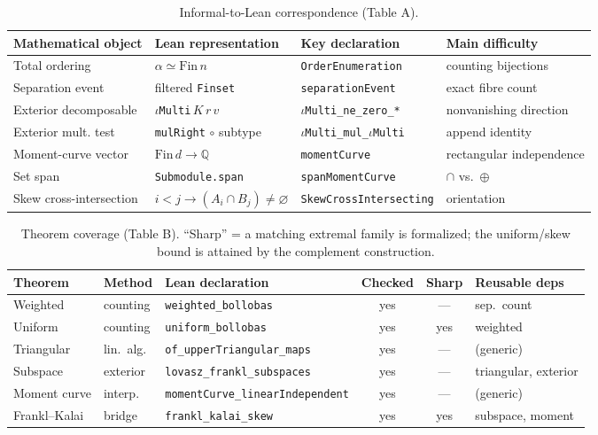\documentclass[11pt]{article}
\newcommand{\QQ}{\mathbb{Q}}
\begin{document}
\begin{table}[t]
\centering\small
\begin{tabular}{@{}llll@{}}
\toprule
Mathematical object & Lean representation & Key declaration & Main difficulty \\
\midrule
Total ordering & $\alpha\simeq\mathrm{Fin}\,n$ & \texttt{OrderEnumeration} & counting bijections \\
Separation event & filtered \texttt{Finset} & \texttt{separationEvent} & exact fibre count \\
Exterior decomposable & $\iota$\texttt{Multi}$\,K\,r\,v$ & \texttt{\(\iota\)Multi\_ne\_zero\_*} & nonvanishing direction \\
Exterior mult. test & \texttt{mulRight} $\circ$ subtype & \texttt{\(\iota\)Multi\_mul\_\(\iota\)Multi} & append identity \\
Moment-curve vector & $\mathrm{Fin}\,d\to\QQ$ & \texttt{momentCurve} & rectangular independence \\
Set span & \texttt{Submodule.span} & \texttt{spanMomentCurve} & $\cap$ vs.\ $\oplus$ \\
Skew cross-intersection & $i<j\to(A_i\cap B_j)\neq\varnothing$ & \texttt{SkewCrossIntersecting} & orientation \\
\bottomrule
\end{tabular}
\caption{Informal-to-Lean correspondence (Table A).}
\label{tab:correspondence}
\end{table}

\begin{table}[t]
\centering\small
\begin{tabular}{@{}lllccl@{}}
\toprule
Theorem & Method & Lean declaration & Checked & Sharp & Reusable deps \\
\midrule
Weighted & counting & \texttt{weighted\_bollobas} & yes & --- & sep.\ count \\
Uniform & counting & \texttt{uniform\_bollobas} & yes & yes & weighted \\
Triangular & lin.\ alg. & \texttt{of\_upperTriangular\_maps} & yes & --- & (generic) \\
Subspace & exterior & \texttt{lovasz\_frankl\_subspaces} & yes & --- & triangular, exterior \\
Moment curve & interp. & \texttt{momentCurve\_linearIndependent} & yes & --- & (generic) \\
Frankl--Kalai & bridge & \texttt{frankl\_kalai\_skew} & yes & yes & subspace, moment \\
\bottomrule
\end{tabular}
\caption{Theorem coverage (Table B). ``Sharp'' = a matching extremal family is
formalized; the uniform/skew bound is attained by the complement construction.}
\label{tab:coverage}
\end{table}
\end{document}
